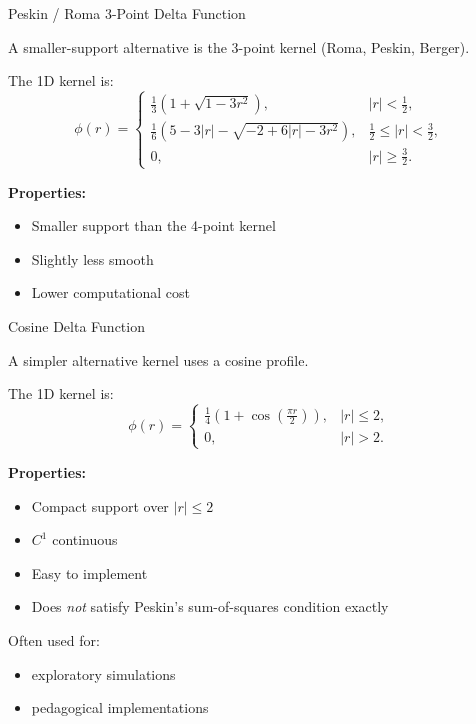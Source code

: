 \documentclass{beamer}
\begin{document}
\begin{frame}{Peskin / Roma 3-Point Delta Function}

A smaller-support alternative is the 3-point kernel
(Roma, Peskin, Berger).

\medskip

The 1D kernel is:
\[
\phi(r)
=
\begin{cases}
\frac{1}{3}
\left(
1 + \sqrt{1 - 3r^2}
\right),
& |r| < \frac{1}{2}, \\[6pt]
\frac{1}{6}
\left(
5 - 3|r| - \sqrt{-2 + 6|r| - 3r^2}
\right),
& \frac{1}{2} \le |r| < \frac{3}{2}, \\[6pt]
0,
& |r| \ge \frac{3}{2}.
\end{cases}
\]

\medskip

\textbf{Properties:}
\begin{itemize}
    \item Smaller support than the 4-point kernel
    \item Slightly less smooth
    \item Lower computational cost
\end{itemize}

\end{frame}

\begin{frame}{Cosine Delta Function}

A simpler alternative kernel uses a cosine profile.

\medskip

The 1D kernel is:
\[
\phi(r)
=
\begin{cases}
\frac{1}{4}
\left(
1 + \cos\!\left(\frac{\pi r}{2}\right)
\right),
& |r| \le 2, \\[6pt]
0,
& |r| > 2.
\end{cases}
\]

\medskip

\textbf{Properties:}
\begin{itemize}
    \item Compact support over $|r|\le 2$
    \item $C^1$ continuous
    \item Easy to implement
    \item Does \emph{not} satisfy Peskin’s sum-of-squares condition exactly
\end{itemize}

\medskip

Often used for:
\begin{itemize}
    \item exploratory simulations
    \item pedagogical implementations
\end{itemize}

\end{frame}
\end{document}
